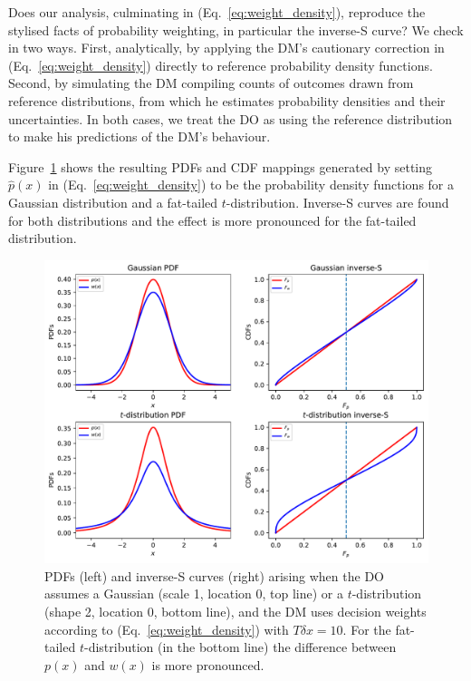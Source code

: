 \documentclass[a4paper, 12pt]{article}
\newcommand{\eref}[1]{(Eq.~\ref{eq:#1})}
\newcommand{\flabel}[1]{\label{fig:#1}}
\newcommand{\Fref}[1]{Figure~\ref{fig:#1}}
\begin{document}
Does our analysis, culminating in \eref{weight_density}, reproduce the stylised facts of probability weighting, in particular the inverse-S curve? We check in two ways. First, analytically, by applying the DM's cautionary correction in \eref{weight_density} directly to reference probability density functions. Second, by simulating the DM compiling counts of outcomes drawn from reference distributions, from which he estimates probability densities and their uncertainties. In both cases, we treat the DO as using the reference distribution to make his predictions of the DM's behaviour.

\Fref{square_root_error} shows the resulting PDFs and CDF mappings generated by setting $\hat{p}(x)$ in \eref{weight_density} to be the probability density functions for a Gaussian distribution and a fat-tailed $t$-distribution. Inverse-S curves are found for both distributions and the effect is more pronounced for the fat-tailed distribution.
\begin{figure}[htb]
\centering
\includegraphics[width=1.0\textwidth]{./figs/square_root_error.pdf}
\caption{PDFs (left) and inverse-S curves (right) arising when the DO assumes a Gaussian (scale 1, location 0, top line) or a $t$-distribution (shape 2, location 0, bottom line), and the DM uses decision weights according to \eref{weight_density} with $T\delta x=10$. For the fat-tailed $t$-distribution (in the bottom line) the difference between $p(x)$ and $w(x)$ is more pronounced.}
\flabel{square_root_error}
\end{figure}
\end{document}
